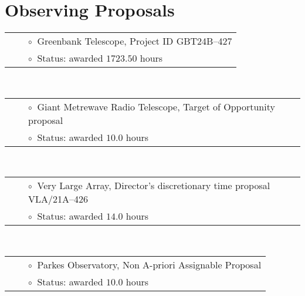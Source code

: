 \documentclass[11pt,letterpaper,sans,unicode]{moderncv}
\begin{document}
\section{Observing Proposals}
{\small
{}
\begin{tabular}{rcl}
&\hspace{0.4cm} &{\color{color1} $\circ\;\;$}Greenbank Telescope, Project ID \textsc{GBT24B--427} \\
&\hspace{0.4cm} &{\color{color1} $\circ\;\;$}Status: awarded $\mathbf{1723.50}$ hours
\end{tabular}\\

\begin{tabular}{rcl}
&\hspace{0.4cm} &{\color{color1} $\circ\;\;$}Giant Metrewave Radio Telescope, Target of Opportunity proposal  \\
&\hspace{0.4cm} &{\color{color1} $\circ\;\;$}Status: awarded $10.0$ hours
\end{tabular} \\

\begin{tabular}{rcl}
&\hspace{0.4cm} &{\color{color1} $\circ\;\;$}Very Large Array, Director's discretionary time proposal VLA/\textsc{21A--426} \\
&\hspace{0.4cm} &{\color{color1} $\circ\;\;$}Status: awarded $14.0$ hours
\end{tabular} \\

\begin{tabular}{rcl}
&\hspace{0.4cm} &{\color{color1} $\circ\;\;$}Parkes Observatory, Non A-priori Assignable Proposal \\
&\hspace{0.4cm} &{\color{color1} $\circ\;\;$}Status: awarded $10.0$ hours
\end{tabular} \\

}
\end{document}
